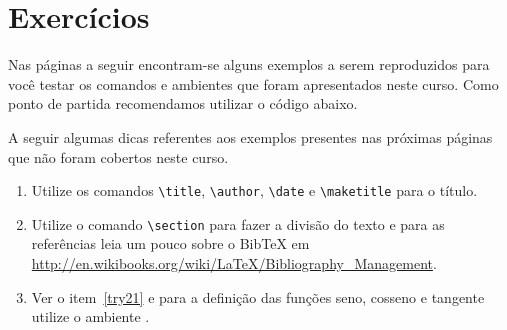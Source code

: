 % 
% 
% 
% 
% 
% 
%
%
\chapter{Exerc\'{i}cios}
Nas p\'{a}ginas a seguir encontram-se alguns exemplos a serem reproduzidos para voc\^{e} testar os comandos e ambientes que foram apresentados neste curso. Como ponto de partida recomendamos utilizar o c\'{o}digo abaixo.

A seguir algumas dicas referentes aos exemplos presentes nas pr\'{o}ximas p\'{a}ginas que n\~{a}o foram cobertos neste curso.
\begin{enumerate}
    \item \label{try11} Utilize os comandos \lstinline!\title!, \lstinline!\author!, \lstinline!\date! e \lstinline!\maketitle! para o t\'{i}tulo.
    \item \label{try21} Utilize o comando \lstinline!\section! para fazer a divis\~{a}o do texto e para as refer\^{e}ncias leia um pouco sobre o BibTeX em \url{http://en.wikibooks.org/wiki/LaTeX/Bibliography_Management}.
    \item \label{try31} Ver o item~\ref{try21} e para a defini\c{c}\~{a}o das fun\c{c}\~{o}es seno, cosseno e tangente utilize o ambiente .
\end{enumerate}

